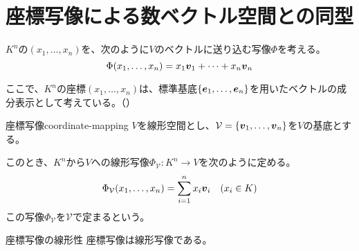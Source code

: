 \documentclass[../../../topic_linear-algebra]{subfiles}
\begin{document}
\sectionline
\section{座標写像による数ベクトル空間との同型}

$K^n$の$(x_1,\dots,x_n)$を、次のように$V$のベクトルに送り込む写像$\Phi$を考える。
\begin{equation*}
  \Phi(x_1,\dots,x_n) = x_1 \vb*{v}_1 + \cdots + x_n \vb*{v}_n
\end{equation*}

ここで、$K^n$の座標$(x_1,\dots,x_n)$は、標準基底$\{ \vb*{e}_1, \dots, \vb*{e}_n \}$を用いたベクトルの成分表示として考えている。（）

\begin{definition}{座標写像}{coordinate-mapping}
  $V$を線形空間とし、$\mathcal{V} = \{ \vb*{v}_1, \dots, \vb*{v}_n \}$を$V$の基底とする。

  このとき、$K^n$から$V$への線形写像$\Phi_{\mathcal{V}}\colon K^n \to V$を次のように定める。
  \begin{equation*}
    \Phi_{\mathcal{V}}(x_1,\dots,x_n) = \sum_{i=1}^n x_i \vb*{v}_i \quad (x_i \in K)
  \end{equation*}
  この写像$\Phi_{\mathcal{V}}$を$\mathcal{V}$で定まるという。
\end{definition}

\br

\begin{theorem*}{座標写像の線形性}
  座標写像は線形写像である。
\end{theorem*}
\end{document}
